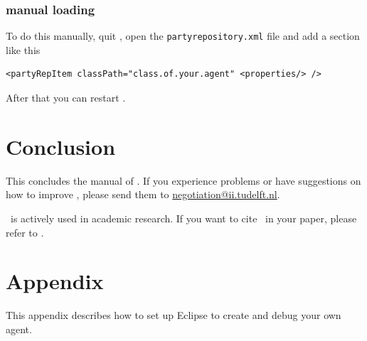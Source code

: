\documentclass[]{article}
\begin{document}
\subsubsection{manual loading}
To do this manually, quit \Genius , open the \verb|partyrepository.xml| file and add a section like this

\begin{lstlisting}
<partyRepItem classPath="class.of.your.agent" <properties/> />
\end{lstlisting}

After that you can restart \Genius .
\FloatBarrier

\section{Conclusion}
This concludes the manual of \Genius. If you experience problems or have suggestions on how to improve \Genius, please send them to \url{negotiation@ii.tudelft.nl}. 

\Genius\ is actively used in academic research. If you want to cite \Genius\ in your paper, please refer to \cite{Genius}.


\newpage
\section{Appendix}
This appendix describes how to set up Eclipse to create and debug your own agent.

\label{sec:appendix}
\end{document}
